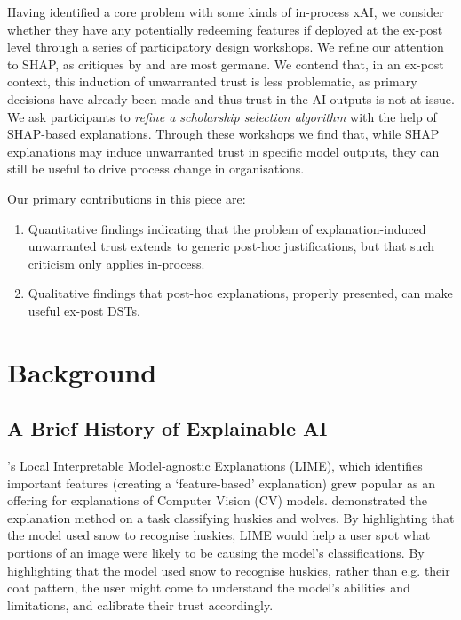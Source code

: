 Having identified a core problem with some kinds of in-process xAI, we consider whether they have any potentially redeeming features if deployed at the ex-post level through a series of participatory design workshops. We refine our attention to SHAP, as critiques by \textcite{Lipton} and \textcite{miller_explainable_2023} are most germane. We contend that, in an ex-post context, this induction of unwarranted trust is less problematic, as primary decisions have already been made and thus trust in the AI outputs is not at issue. We ask participants to \emph{refine a scholarship selection algorithm} with the help of SHAP-based explanations. Through these workshops we find that, while SHAP explanations may induce unwarranted trust in specific model outputs, they can still be useful to drive process change in organisations.

Our primary contributions in this piece are:

\begin{enumerate}
    \item Quantitative findings indicating that the problem of explanation-induced unwarranted trust extends to generic post-hoc justifications, but that such criticism only applies in-process.
    \item Qualitative findings that post-hoc explanations, properly presented, can make useful ex-post DSTs.
\end{enumerate}

\section{Background}
\subsection{A Brief History of Explainable AI}\label{ssec:history}
\textcite{ribeiro_why_2016}'s Local Interpretable Model-agnostic Explanations (LIME), which identifies important features (creating a `feature-based' explanation) grew popular as an offering for explanations of Computer Vision (CV) models. \textcite{ribeiro_why_2016} demonstrated the explanation method on a task classifying huskies and wolves. By highlighting that the model used snow to recognise huskies, LIME would help a user spot what portions of an image were likely to be causing the model's classifications. By highlighting that the model used snow to recognise huskies, rather than e.g. their coat pattern, the user might come to understand the model's abilities and limitations, and calibrate their trust accordingly.

